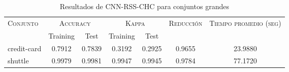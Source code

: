 \begin{table}[]
\centering
\begin{tabular}{l c c c c c c}
\hline
\multirow{2}{*}{\textsc{Conjunto}}
	& \multicolumn{2}{c}{\textsc{Accuracy}}
	& \multicolumn{2}{c}{\textsc{Kappa}}
	& \textsc{Reducción}
	& \textsc{Tiempo promedio (seg)} \\
	& Training & Test
	& Training & Test \\ 
\hline
\hline

credit-card & 0.7912 & 0.7839 & 0.3192 & 0.2925 & 0.9655 & 23.9880 \\
shuttle & 0.9979 & 0.9981 & 0.9947 & 0.9945 & 0.9784 & 77.1720 \\

\hline
\end{tabular}
\caption{Resultados de CNN-RSS-CHC para conjuntos grandes }
\label{res-grande-CNN-RSS-CHC}
\end{table}

